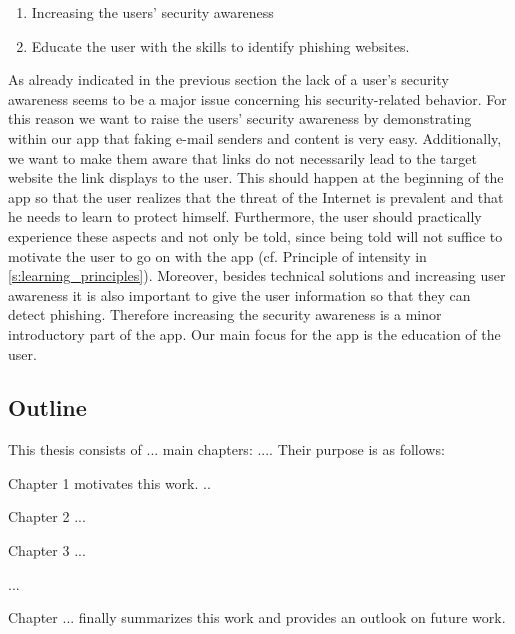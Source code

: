\begin{enumerate}
	\item Increasing the users' security awareness
	\item Educate the user with the skills to identify phishing websites.

\end{enumerate}

As already indicated in the previous section the lack of a user's security awareness seems to be a major issue concerning his security-related behavior.
 For this reason we want to raise the users' security awareness by demonstrating within our app that faking e-mail senders and content is very easy.
 Additionally, we want to make them aware that links do not necessarily lead to the target website the link displays to the user.
 This should happen at the beginning of the app so that the user realizes that the threat of the Internet is prevalent and that he needs to learn to protect himself.
 Furthermore, the user should practically experience these aspects and not only be told, since being told will not suffice to motivate the user to go on with the app (cf. Principle of intensity in \autoref{s:learning_principles}).
 Moreover, besides technical solutions and increasing user awareness it is also important to give the user information so that they can detect phishing.
 Therefore increasing the security awareness is a minor introductory part of the app.
 Our main focus for the app is the education of the user.

\subsection{Outline}


This thesis consists of ... main chapters: .... Their purpose is as follows:

Chapter 1 motivates this work.
..

Chapter 2 ...

Chapter 3 ...

...

Chapter ... finally summarizes this work and provides an outlook on future work.






